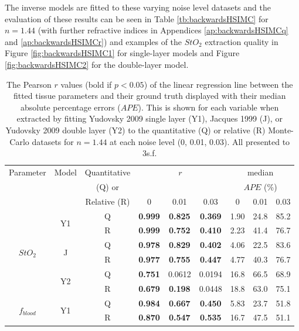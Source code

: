 The inverse models are fitted to these varying noise level datasets and the evaluation of these results can be seen in Table \ref{tb:backwardsHSIMC} for $n=1.44$ (with further refractive indices in Appendices \ref{ap:backwardsHSIMCq} and \ref{ap:backwardsHSIMCr}) and examples of the $StO_2$ extraction quality in Figure \ref{fig:backwardsHSIMC1} for single-layer models and Figure \ref{fig:backwardsHSIMC2} for the double-layer model. 

\begin{table}[htb!]
    \centering
    \caption{The Pearson $r$ values (bold if $p<0.05$) of the linear regression line between the fitted tissue parameters and their ground truth displayed with their median absolute percentage errors ($APE$). This is shown for each variable when extracted by fitting Yudovsky 2009 single layer (Y1), Jacques 1999 (J), or Yudovsky 2009 double layer (Y2) to the quantitative (Q) or relative (R) Monte-Carlo datasets for $n=1.44$ at each noise level (0, 0.01, 0.03). All presented to 3s.f.}
    \begin{tabular}{|ccc|ccc|ccc|}
        \hline
        Parameter & Model & Quantitative & \multicolumn{3}{c}{$r$} & \multicolumn{3}{|c|}{median} \\
        & & (Q) or & \multicolumn{3}{c}{} & \multicolumn{3}{|c|}{$APE$ (\%)} \\
        & & Relative (R) & 0 & 0.01 & 0.03 & 0 & 0.01 & 0.03 \\
        \hline
        \multirow{6}{*}{$StO_2$} & \multirow{2}{*}{Y1} & Q & \textbf{0.999} & \textbf{0.825} & \textbf{0.369} & 1.90 & 24.8 & 85.2 \\
        & & R & \textbf{0.999} & \textbf{0.752} & \textbf{0.410} & 2.23 & 41.4 & 76.7 \\
        \cline{2-9}
        & \multirow{2}{*}{J} & Q & \textbf{0.978} & \textbf{0.829} & \textbf{0.402} & 4.06 & 22.5 & 83.6 \\
        & & R & \textbf{0.977} & \textbf{0.755} & \textbf{0.447} & 4.77 & 40.3 & 76.7 \\
        \cline{2-9}
        & \multirow{2}{*}{Y2} & Q & \textbf{0.751} & 0.0612 & 0.0194 & 16.8 & 66.5 & 68.9 \\
        & & R & \textbf{0.679} & \textbf{0.198} & 0.0448 & 18.8 & 63.0 & 75.1 \\
        \hline
        \multirow{6}{*}{$f_{blood}$} & \multirow{2}{*}{Y1} & Q & \textbf{0.984} & \textbf{0.667} & \textbf{0.450} & 5.83 & 23.7 & 51.8\\
        & & R & \textbf{0.870} & \textbf{0.547} & \textbf{0.535} & 16.7 & 47.5 & 51.1\\

\end{tabular}
\end{table}
